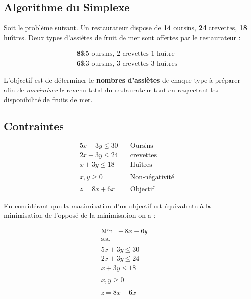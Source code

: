 \documentclass{report}
\begin{document}
\begin{multicols*}{3}
\chapter{Algorithme du Simplexe}
Soit le problème suivant. Un restaurateur dispose de \textbf{14} oursins, 
\textbf{24} crevettes, \textbf{18} huîtres. Deux types d'assiètes 
de fruit de mer sont offertes par le restaurateur :

\begin{align*}
    \textbf{8\$} \colon \text{5 oursins, 2 crevettes 1 huître}  \\
    \textbf{6\$} \colon \text{3 oursins, 3 crevettes 3 huîtres}   
\end{align*}

L'objectif est de déterminer le \textbf{nombres d'assiètes} de chaque 
type à préparer afin de \textit{maximiser} 
le revenu total du restaurateur tout en 
respectant les disponibilité de fruits de mer. 


\section{Contraintes}
\begin{align*}
    5x + 3y \leq 30& \quad \text{Oursins} \\
    2x + 3y \leq 24& \quad \text{crevettes} \\ 
    x  + 3y \leq 18& \quad \text{Huîtres}
    \\
    \\ 
    x, y \geq 0& \quad \text{Non-négativité}
    \\ 
    \\
    z = 8x + 6x& \quad \text{Objectif}
\end{align*}




En considérant que la maximisation d'un objectif est 
équivalente à la minimisation de l'opposé de la minimisation on a :


\begin{align*}
    \text{Min} \;\; -8x  -6y& \\
    \text{s.a.}
    \\
    \\
    5x + 3y \leq 30& \\
    2x + 3y \leq 24& \\
    x  + 3y \leq 18& 
    \\
    \\ 
    x, y \geq 0& 
    \\ 
    \\
    z = 8x + 6x& 
\end{align*}



\end{multicols*}
\end{document}
